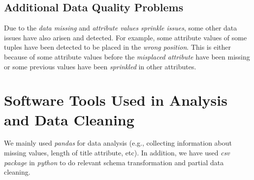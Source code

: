 \documentclass[10pt, oneside]{article}
\begin{document}
\subsection*{Additional Data Quality Problems}
Due to the \textit{data missing} and \textit{attribute values sprinkle issues}, some other data issues have also arisen and detected. For example, some attribute values
of some tuples have been detected to be placed in the \textit{wrong position}. This is either because of some attribute values before the \textit{misplaced attribute} 
have been missing or some previous values have been \textit{sprinkled} in other attributes.

\section*{Software Tools Used in Analysis and Data Cleaning}
We mainly used \textit{pandas} for data analysis (e.g., collecting information about missing values, length of title attribute, etc). In addition, we have used \textit{csv package} 
in \textit{python} to do relevant schema transformation and partial data cleaning.  
\end{document}
